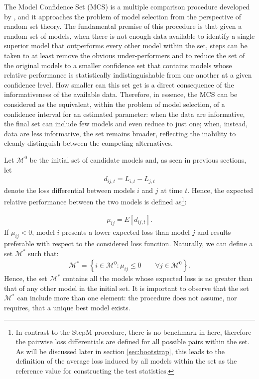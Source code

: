 \documentclass{article} %
\begin{document}
	The Model Confidence Set (MCS) is a multiple comparison procedure developed by \textcite{HANSENLUNDE_NASON2011}, and it approaches the problem of model selection from the perspective of random set theory. The fundamental premise of this procedure is that given a random set of models, when there is not enough data available to identify a single superior model that outperforms every other model within the set, steps can be taken to at least remove the obvious under-performers and to reduce the set of the original models to a smaller confidence set that contains models whose relative performance is statistically indistinguishable from one another at a given confidence level. How smaller can this set get is a direct consequence of the informativeness of the available data. Therefore, in essence, the MCS can be considered as the equivalent, within the problem of model selection, of a confidence interval for an estimated parameter: when the data are informative, the final set can include few models and even reduce to just one; when, instead, data are less informative, the set remains broader, reflecting the inability to cleanly distinguish between the competing alternatives.
	
	Let $\mathcal{M}^0$ be the initial set of candidate models and, as seen in previous sections, let 
	\begin{align}
	d_{ij,t}=L_{i,t}-L_{j,t}
	\end{align}
	denote the loss differential between models $i$ and $j$ at time $t$.
	Hence, the expected relative performance between the two models is defined as\footnote{In contrast to the StepM procedure, there is no benchmark in here, therefore the pairwise loss differentials are defined for all possible pairs within the set. As will be discussed later in section \ref{sec:bootstrap}, this leads to the definition of the average loss induced by all models within the set as the reference value for constructing the test statistics.}:
	
	\begin{align}
	\mu_{ij}=E[d_{ij,t}].
	\end{align}
	If $\mu_{ij}<0$, model $i$ presents a lower expected loss than model $j$ and results preferable with respect to the considered loss function. Naturally, we can define a set $\mathcal{M}^*$ such that:
	\begin{align}
	\mathcal{M}^*
	=
	\left\{
	i \in \mathcal{M}^0 :
	\mu_{ij}\leq 0
	\quad\quad \forall j \in \mathcal{M}^0
	\right\}.
	\end{align}
	Hence, the set $\mathcal{M}^*$ contains all the models whose expected loss is no greater than that of any other model in the initial set. It is important to observe that the set $\mathcal{M}^*$ can include more than one element: the procedure does not assume, nor requires, that a unique best model exists.  
	
\end{document}
